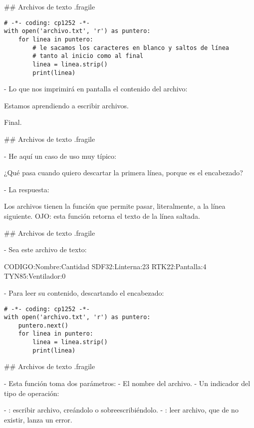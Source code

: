 ## Archivos de texto {.fragile}


\begin{lstlisting}[style=frame02]
# -*- coding: cp1252 -*-
with open('archivo.txt', 'r') as puntero:
    for linea in puntero:
        # le sacamos los caracteres en blanco y saltos de línea
        # tanto al inicio como al final
        linea = linea.strip()
        print(linea)
\end{lstlisting}

- Lo que nos imprimirá en pantalla el contenido del archivo:

\begin{exampleFile}
Estamos aprendiendo a escribir archivos.

Final.
\end{exampleFile}

## Archivos de texto {.fragile}


- He aquí un caso de uso muy típico:

\bgnblockidea
¿Qué pasa cuando quiero descartar la primera línea, porque es el encabezado?
\trmblockidea

\pause

- La respuesta:

\bgnblockdefinition
Los archivos tienen la función  que permite pasar, literalmente,
a la línea siguiente.
OJO: esta función retorna el texto de la línea saltada.
\trmblockdefinition

## Archivos de texto {.fragile}


- Sea este archivo de texto:

\begin{exampleFile}
CODIGO:Nombre:Cantidad
SDF32:Linterna:23
RTK22:Pantalla:4
TYN85:Ventilador:0
\end{exampleFile}

- Para leer su contenido, descartando el encabezado:

\begin{lstlisting}[style=frame02,linebackgroundcolor={\btLstHL{3}}]
# -*- coding: cp1252 -*-
with open('archivo.txt', 'r') as puntero:
    puntero.next()
    for linea in puntero:
        linea = linea.strip()
        print(linea)
\end{lstlisting}


## Archivos de texto {.fragile}

    
- Esta función toma dos parámetros:
    - El nombre del archivo.
    - Un indicador del tipo de operación:

\bgnblockgood

- : escribir archivo, creándolo o sobreescribiéndolo.
- : leer archivo, que de no existir, lanza un error.

\trmblockgood

